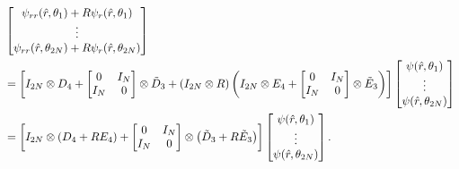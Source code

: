 \begin{align*}
 &\begin{bmatrix}
  \psi_{rr}(\hat{r},\theta_1   ) + R \psi_r(\hat{r},\theta_1   ) \\
   \vdots \\
  \psi_{rr}(\hat{r},\theta_{2N}) + R \psi_r(\hat{r},\theta_{2N})
 \end{bmatrix} \\
 &=
 \left[
  I_{2N} \otimes D_4 +
 \begin{bmatrix} 0 & I_N \\ I_N & 0\end{bmatrix}
 \otimes \tilde{D}_3
 +
 (I_{2N} \otimes R)
 \left(I_{2N} \otimes E_4 +
    \begin{bmatrix} 0 & I_N \\ I_N & 0\end{bmatrix}
    \otimes \tilde{E}_3\right)
 \right]
 \begin{bmatrix}
  \psi(\hat{r},\theta_1) \\ \vdots \\ \psi(\hat{r},\theta_{2N})
 \end{bmatrix} \\
 &=
 \left[
  I_{2N} \otimes \left( D_4 + R E_4 \right) +
  \begin{bmatrix} 0 & I_N \\ I_N & 0\end{bmatrix} \otimes
  \left( \tilde{D}_3 + R \tilde{E}_3 \right)
 \right]
 \begin{bmatrix}
  \psi(\hat{r},\theta_1) \\ \vdots \\ \psi(\hat{r},\theta_{2N})
 \end{bmatrix}.
\end{align*}

